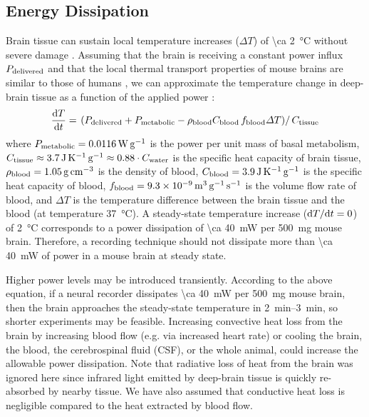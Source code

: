 \subsection{Energy Dissipation}

Brain tissue can sustain local temperature increases ($\Delta T$) of \SI{\ca 2}{\celsius} without severe damage \cite{azevedo09}.
Assuming that the brain is receiving a constant power influx $P_{\text{\scriptsize delivered}}$ and that the local thermal transport properties of mouse brains are similar to those of humans \cite{allen02}, we can approximate the temperature change in deep-brain tissue as a function of the applied power \cite{sotero11}:
\[\frac{\text{d} T}{\text{d} t} = \left.\left(P_{\text{\scriptsize delivered}} + P_{\text{\scriptsize metabolic}} - \rho_{\text{\scriptsize blood}} C_{\text{\scriptsize blood}}\,f_{\text{\scriptsize blood}} \Delta T\right)\right/C_{\text{\scriptsize tissue}}\]
where $P_{\text{\scriptsize metabolic}} = \SI{0.0116}{\watt\per\gram}$ is the power per unit mass of basal metabolism, $C_{\text{\scriptsize tissue}} \approx \SI{3.7}{\joule\per\kelvin\per\gram} \approx 0.88\cdot C_{\text{\scriptsize water}}$ is the specific heat capacity of brain tissue, $\rho_{\text{\scriptsize blood}}=\SI{1.05}{\gram\per\centi\meter\cubed}$ is the density of blood, $C_{\text{\scriptsize blood}} = \SI{3.9}{\joule\per\kelvin\per\gram}$ is the specific heat capacity of blood, $f_{\text{\scriptsize blood}} = \SI{9.3e-9}{\meter\cubed\per\gram\per\second}$ is the volume flow rate of blood, and $\Delta T$ is the temperature difference between the brain tissue and the blood (at temperature \SI{37}{\celsius}).
A steady-state temperature increase ($\text{d} T/\text{d} t = 0$) of \SI{2}{\celsius} corresponds to a power dissipation of \SI{\ca 40}{\milli\watt} per \SI{500}{\milli\gram} mouse brain.
Therefore, a recording technique should not dissipate more than \SI{\ca 40}{\milli\watt} of power in a mouse brain at steady state.

Higher power levels may be introduced transiently.
According to the above equation, if a neural recorder dissipates \SI{\ca 40}{\milli\watt} per \SI{500}{\milli\gram} mouse brain, then the brain approaches the steady-state temperature in \SIrange{2}{3}{\minute}, so shorter experiments may be feasible.
Increasing convective heat loss from the brain by increasing blood flow (e.g. via increased heart rate) or cooling the brain, the blood, the cerebrospinal fluid (CSF), or the whole animal, could increase the allowable power dissipation.
Note that radiative loss of heat from the brain was ignored here since infrared light emitted by deep-brain tissue is quickly re-absorbed by nearby tissue.
We have also assumed that conductive heat loss is negligible compared to the heat extracted by blood flow.

